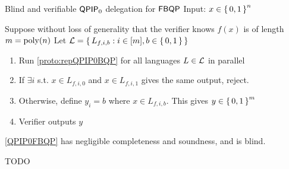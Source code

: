 \begin{protocol}{Blind and verifiable $\operatorname{\mathsf{QPIP}}_0$ delegation for $\operatorname{\mathsf{FBQP}}$}
	\label{QPIP0FBQP}
	Input: $x\in\set{0, 1}^n$

	Suppose without loss of generality that the verifier knows $f(x)$ is of length $m=\operatorname*{\operatorname{poly}}(n)$ 
	Let ${\cal L} = \set{L_{f, i, b}: i\in[m], b\in\set{0, 1}}$
	\begin{enumerate}
		\item Run \cref{proto:repQPIP0BQP} for all languages $L\in{\cal L}$ in parallel
		\item If $\exists i$ s.t. $x\in L_{f, i, 0}$ and $x\in L_{f, i, 1}$ gives the same output, reject.
		\item Otherwise, define $y_i = b$ where $x\in L_{f, i, b}$. This gives $y\in\set{0,1}^m$
		\item Verifier outputs $y$
	\end{enumerate}
\end{protocol}

\begin{theorem}
	\cref{QPIP0FBQP} has negligible completeness and soundness, and is blind.
\end{theorem}
\begin{prf}
	TODO
\end{prf}
